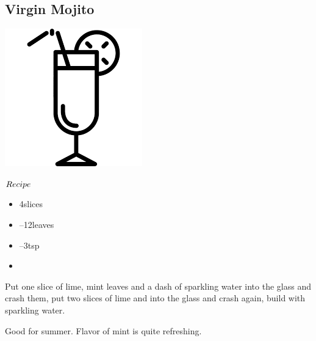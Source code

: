 \subsection{Virgin Mojito}
\vspace{-7.4mm}
\hspace{40mm}
\includegraphics[scale=.07]{cocktail_glass_tall.png}
\vspace{2.5mm}
\begin{itembox}[l]{\boldmath $Recipe$}
\begin{itemize}
\setlength{\parskip}{0cm}
\setlength{\itemsep}{0cm}
\item \lime 4slices
\item {}--12leaves
\item {}--3tsp
\item \soda
\end{itemize}
\vspace{-4mm}
Put one slice of lime, mint leaves and a dash of sparkling water into the glass and crash them, put two slices of lime and \gumsyrup into the glass and crash again, build with sparkling water.
\end{itembox}
Good for summer.
Flavor of mint is quite refreshing.

